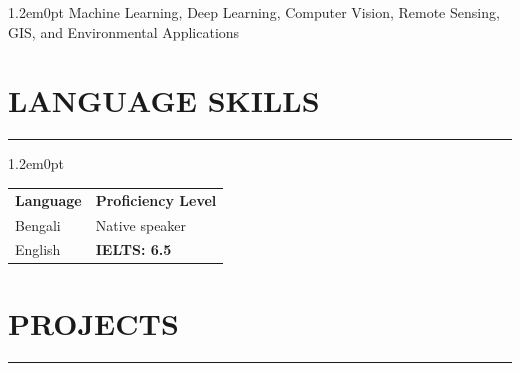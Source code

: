 \documentclass[a4paper,10pt]{article}
\begin{document}
\begin{adjustwidth}{1.2em}{0pt}
Machine Learning, Deep Learning, Computer Vision, Remote Sensing, GIS, and Environmental Applications
\end{adjustwidth}

\section*{LANGUAGE SKILLS}
\hrule\vspace{0.6em}

\begin{adjustwidth}{1.2em}{0pt}
    \begin{tabular}{p{} p{}}
        \rowcolor{theme_2!20}
        \textbf{Language} & \textbf{Proficiency Level} \\
        Bengali & Native speaker\\
        \rowcolor{theme_2!10}
        English & \textbf{IELTS: 6.5} %
    \end{tabular}
\end{adjustwidth}

\section*{PROJECTS}
\hrule\vspace{0.6em}
\end{document}
